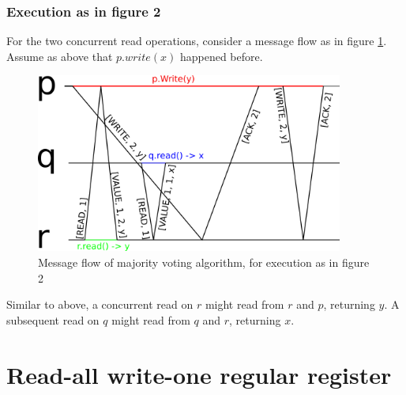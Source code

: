 \documentclass[a4paper]{scrreprt}
\begin{document}
\subsubsection{Execution as in figure 2}

For the two concurrent read operations, consider a message flow as in figure
\ref{fig:majority_voting_2}. Assume as above that $p.write(x)$ happened before.

\begin{figure}[h]
    \centering
    \includegraphics[width=0.9\textwidth]{res/5_1_b_2.png}
    \caption{Message flow of majority voting algorithm, for execution as in figure 2}
    \label{fig:majority_voting_2}
\end{figure}

Similar to above, a concurrent read on $r$ might read from $r$ and $p$,
returning $y$. A subsequent read on $q$ might read from $q$ and $r$, returning
$x$.

\section{Read-all write-one regular register}
\end{document}
